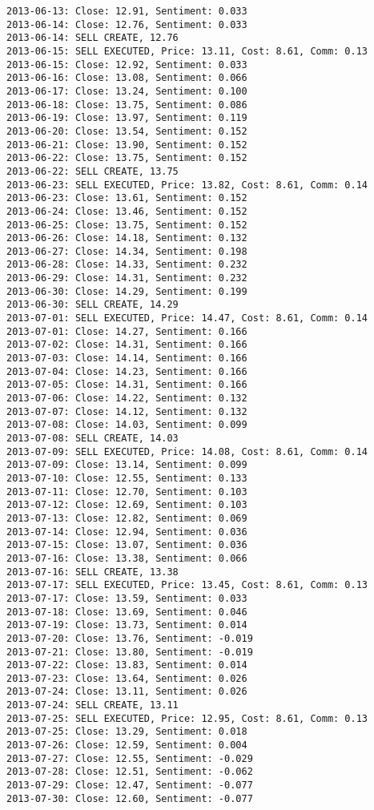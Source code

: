 \documentclass[11pt]{article}
\begin{document}
\begin{Verbatim}[commandchars=\\\{\}]
2013-06-13: Close: 12.91, Sentiment: 0.033
2013-06-14: Close: 12.76, Sentiment: 0.033
2013-06-14: SELL CREATE, 12.76
2013-06-15: SELL EXECUTED, Price: 13.11, Cost: 8.61, Comm: 0.13
2013-06-15: Close: 12.92, Sentiment: 0.033
2013-06-16: Close: 13.08, Sentiment: 0.066
2013-06-17: Close: 13.24, Sentiment: 0.100
2013-06-18: Close: 13.75, Sentiment: 0.086
2013-06-19: Close: 13.97, Sentiment: 0.119
2013-06-20: Close: 13.54, Sentiment: 0.152
2013-06-21: Close: 13.90, Sentiment: 0.152
2013-06-22: Close: 13.75, Sentiment: 0.152
2013-06-22: SELL CREATE, 13.75
2013-06-23: SELL EXECUTED, Price: 13.82, Cost: 8.61, Comm: 0.14
2013-06-23: Close: 13.61, Sentiment: 0.152
2013-06-24: Close: 13.46, Sentiment: 0.152
2013-06-25: Close: 13.75, Sentiment: 0.152
2013-06-26: Close: 14.18, Sentiment: 0.132
2013-06-27: Close: 14.34, Sentiment: 0.198
2013-06-28: Close: 14.33, Sentiment: 0.232
2013-06-29: Close: 14.31, Sentiment: 0.232
2013-06-30: Close: 14.29, Sentiment: 0.199
2013-06-30: SELL CREATE, 14.29
2013-07-01: SELL EXECUTED, Price: 14.47, Cost: 8.61, Comm: 0.14
2013-07-01: Close: 14.27, Sentiment: 0.166
2013-07-02: Close: 14.31, Sentiment: 0.166
2013-07-03: Close: 14.14, Sentiment: 0.166
2013-07-04: Close: 14.23, Sentiment: 0.166
2013-07-05: Close: 14.31, Sentiment: 0.166
2013-07-06: Close: 14.22, Sentiment: 0.132
2013-07-07: Close: 14.12, Sentiment: 0.132
2013-07-08: Close: 14.03, Sentiment: 0.099
2013-07-08: SELL CREATE, 14.03
2013-07-09: SELL EXECUTED, Price: 14.08, Cost: 8.61, Comm: 0.14
2013-07-09: Close: 13.14, Sentiment: 0.099
2013-07-10: Close: 12.55, Sentiment: 0.133
2013-07-11: Close: 12.70, Sentiment: 0.103
2013-07-12: Close: 12.69, Sentiment: 0.103
2013-07-13: Close: 12.82, Sentiment: 0.069
2013-07-14: Close: 12.94, Sentiment: 0.036
2013-07-15: Close: 13.07, Sentiment: 0.036
2013-07-16: Close: 13.38, Sentiment: 0.066
2013-07-16: SELL CREATE, 13.38
2013-07-17: SELL EXECUTED, Price: 13.45, Cost: 8.61, Comm: 0.13
2013-07-17: Close: 13.59, Sentiment: 0.033
2013-07-18: Close: 13.69, Sentiment: 0.046
2013-07-19: Close: 13.73, Sentiment: 0.014
2013-07-20: Close: 13.76, Sentiment: -0.019
2013-07-21: Close: 13.80, Sentiment: -0.019
2013-07-22: Close: 13.83, Sentiment: 0.014
2013-07-23: Close: 13.64, Sentiment: 0.026
2013-07-24: Close: 13.11, Sentiment: 0.026
2013-07-24: SELL CREATE, 13.11
2013-07-25: SELL EXECUTED, Price: 12.95, Cost: 8.61, Comm: 0.13
2013-07-25: Close: 13.29, Sentiment: 0.018
2013-07-26: Close: 12.59, Sentiment: 0.004
2013-07-27: Close: 12.55, Sentiment: -0.029
2013-07-28: Close: 12.51, Sentiment: -0.062
2013-07-29: Close: 12.47, Sentiment: -0.077
2013-07-30: Close: 12.60, Sentiment: -0.077

\end{Verbatim}
\end{document}
